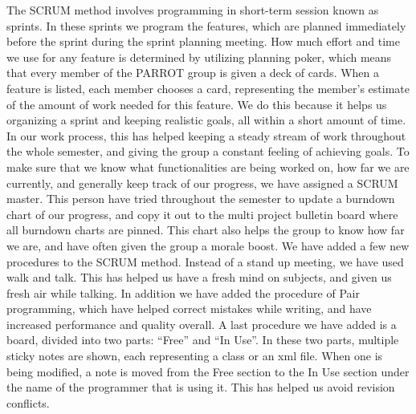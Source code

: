 The SCRUM method involves programming in short-term session known as sprints. 
In these sprints we program the features, which are planned immediately before the sprint during the sprint planning meeting.\newline 
How much effort and time we use for any feature is determined by utilizing planning poker, which means that every member of the PARROT group is given a deck of cards. 
When a feature is listed, each member chooses a card, representing the member's estimate of the amount of work needed for this feature.  
We do this because it helps us organizing a sprint and keeping realistic goals, all within a short amount of time.\newline 
In our work process, this has helped keeping a steady stream of work throughout the whole semester, and giving the group a constant feeling of achieving goals.\newline 
To make sure that we know what functionalities are being worked on, how far we are currently, and generally keep track of our progress, we have assigned a SCRUM master. This person have tried throughout the semester to update a burndown chart of our progress, and copy it out to the multi project bulletin board where all burndown charts are pinned.\newline 
This chart also helps the group to know how far we are, and have often given the group a morale boost.\newline
We have added a few new procedures to the SCRUM method. Instead of a stand up meeting, we have used walk and talk. This has helped us have a fresh mind on subjects, and given us fresh air while talking.\newline
In addition we have added the procedure of Pair programming, which have helped correct mistakes while writing, and have increased performance and quality overall. 
A last procedure we have added is a board, divided into two parts: ``Free'' and ``In Use''.
In these two parts, multiple sticky notes are shown, each representing a class or an xml file. When one is being modified, a note is moved from the Free section to the In Use section under the name of the programmer that is using it. This has helped us avoid revision conflicts.
\\

